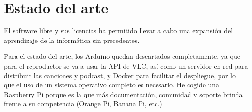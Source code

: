 \chapter{Estado del arte}

El software libre y sus licencias \cite{gplv3} ha permitido llevar a cabo una expansión del
aprendizaje de la informática sin precedentes.

Para el estado del arte, los Arduino quedan descartados completamente, ya que para el reproductor se va a usar la API de VLC, así como un servidor en red para distribuir las canciones y podcast, y Docker para facilitar el despliegue, por lo que el uso de un sistema operativo completo es necesario. He cogido una Raspberry Pi porque es la que más documentación, comunidad y soporte brinda frente a su competencia (Orange Pi, Banana Pi, etc.)
